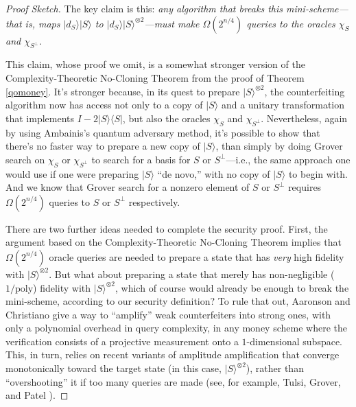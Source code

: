 \documentclass[12pt]{report}
\theoremstyle{plain}
\theoremstyle{definition}
\renewcommand{\bra}[1]{\langle#1|}
\renewcommand{\ket}[1]{|#1\rangle}
\begin{document}
\begin{proof}[Proof Sketch]
The key claim is this: {\em any algorithm that breaks this mini-scheme---that is, maps $\ket{d_S}\ket S$ to $\ket{d_S}{\ket S}^{\otimes 2}$---must make $\Omega(2^{n/4})$ queries to the oracles $\chi_S$ and $\chi_{S^\perp}$.}

This claim, whose proof we omit, is a somewhat stronger version of the Complexity-Theoretic No-Cloning Theorem from the proof of Theorem \ref{qomoney}.  It's stronger because, in its quest to prepare $\ket{S}^{\otimes 2}$, the counterfeiting algorithm now has access not only to a copy of $\ket{S}$ and a unitary transformation that implements $I-2\ket{S}\bra{S}$, but also the oracles $\chi_S$ and $\chi_{S^\perp}$.  Nevertheless, again by using Ambainis's quantum adversary method, it's possible to show that there's no faster way to prepare a new copy of $\ket{S}$, than simply by doing Grover search on $\chi_S$ or $\chi_{S^\perp}$ to search for a basis for $S$ or $S^\perp$---i.e., the same approach one would use if one were preparing $\ket{S}$ ``de novo,'' with no copy of $\ket{S}$ to begin with.  And we know that Grover search for a nonzero element of $S$ or $S^\perp$ requires $\Omega(2^{n/4})$ queries to $S$ or $S^\perp$ respectively.

There are two further ideas needed to complete the security proof.  First, the argument based on the Complexity-Theoretic No-Cloning Theorem implies that $\Omega(2^{n/4})$ oracle queries are needed to prepare a state that has {\em very} high fidelity with $\ket{S}^{\otimes 2}$.  But what about preparing a state that merely has non-negligible ($1/\text{poly}$) fidelity with $\ket{S}^{\otimes 2}$, which of course would already be enough to break the mini-scheme, according to our security definition?  To rule that out, Aaronson and Christiano give a way to ``amplify'' weak counterfeiters into strong ones, with only a polynomial overhead in query complexity, in any money scheme where the verification consists of a projective measurement onto a $1$-dimensional subspace.  This, in turn, relies on recent variants of amplitude amplification that converge monotonically toward the target state (in this case, $\ket{S}^{\otimes 2}$), rather than ``overshooting'' it if too many queries are made (see, for example, Tulsi, Grover, and Patel \cite{tgp}).


\end{proof}
\end{document}
